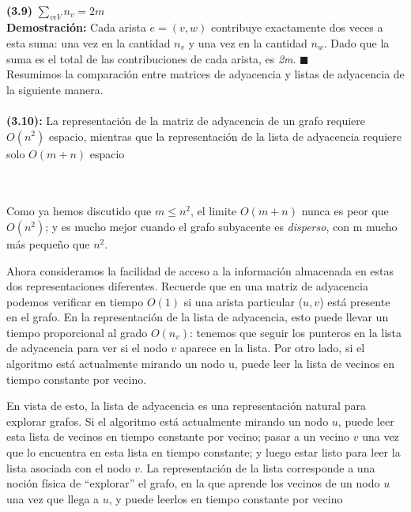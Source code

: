 \documentclass[a4paper, 12pt]{book}
\theoremstyle{dotless}
\begin{document}
\paragraph{}
\textbf{(3.9)} \(\sum_{v\epsilon V} {n_{v}} = 2m\)\\

\textbf{Demostración:} Cada arista \(e = (v, w)\) contribuye exactamente dos veces a esta suma: una vez en la cantidad \(n_{v}\) y una vez en la cantidad \(n_{w}\). Dado que la suma es el total de las contribuciones de cada arista, es \textit{2m}. $ \blacksquare $ \\

Resumimos la comparación entre matrices de adyacencia y listas de adyacencia de la siguiente manera.
\paragraph{}
\colorbox{mygray}{\parbox{15cm}{
	\textbf{(3.10):} La representación de la matriz de adyacencia de un grafo requiere \(O(n^{2})\) espacio, mientras que la representación de la lista de adyacencia requiere solo \(O(m+n)\) espacio}}\\\\
    
    Como ya hemos discutido que \(m ≤ n^{2}\), el limite \(O(m+n)\)  nunca es peor que \(O(n^{2})\); y es mucho mejor cuando el grafo subyacente es \textit{disperso}, con m mucho más pequeño que \(n^{2}\).
    
    Ahora consideramos la facilidad de acceso a la información almacenada en estas dos representaciones diferentes. Recuerde que en una matriz de adyacencia podemos verificar en tiempo \(O(1)\) si una arista particular ($u, v$) está presente en el grafo. En la representación de la lista de adyacencia, esto puede llevar un tiempo proporcional al grado \(O(n_{v})\): tenemos que seguir los punteros en la lista de adyacencia para ver si el nodo $v$ aparece en la lista. Por otro lado, si el algoritmo está actualmente mirando un nodo u, puede leer la lista de vecinos en tiempo constante por vecino.
   
   En vista de esto, la lista de adyacencia es una representación natural para explorar grafos. Si el algoritmo está actualmente mirando un nodo $u$, puede leer esta lista de vecinos en tiempo constante por vecino; pasar a un vecino $v$ una vez que lo encuentra en esta lista en tiempo constante; y luego estar listo para leer la lista asociada con el nodo $v$. La representación de la lista corresponde a una noción física de ``explorar'' el grafo, en la que aprende los vecinos de un nodo $u$ una vez que llega a $u$, y puede leerlos en tiempo constante por vecino
\end{document}
